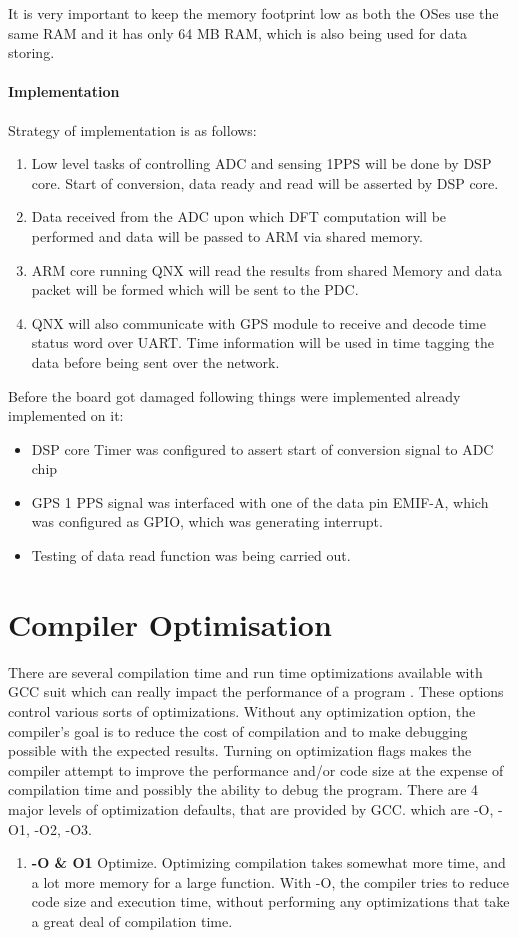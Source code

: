 \begin{appendix}
\begin{itemize}
\end{itemize}
It is very important to keep the memory footprint low as both the OSes use the same RAM and it has only 64 MB RAM, which is also being used for data storing.

\subsubsection{Implementation}
Strategy of implementation is as follows:
\begin{enumerate}
	\item Low level tasks of controlling ADC and sensing 1PPS will be done by DSP core.  Start of conversion, data ready and read will be asserted by DSP core. 
	\item Data received from the ADC upon which DFT computation will be performed and data will be passed to ARM via shared memory.
	\item ARM core running QNX will read the results from shared Memory and data packet will be formed which will be sent to the PDC.
	\item QNX will also communicate with GPS module to receive and decode time status word over UART. Time information will be used in time tagging the data before being sent over the network. 
\end{enumerate}
Before the board got damaged following things were implemented already implemented on it:
\begin{itemize}
	\item DSP core Timer was configured to assert start of conversion signal to ADC chip
	\item GPS 1 PPS signal was interfaced with one of the data pin EMIF-A, which was configured as GPIO, which was generating interrupt. 
	\item Testing of data read function was being carried out.
\end{itemize}

\chapter{Compiler Optimisation}

There are several compilation time and run time optimizations available with GCC suit which can really impact the performance of a program \cite{compilerOpti}. These options control various sorts of optimizations. Without any optimization option, the compiler's goal is to reduce the cost of compilation and to make debugging possible with the expected results. Turning on optimization flags makes the compiler attempt to improve the performance and/or code size at the expense of compilation time and possibly the ability to debug the program. There are 4 major levels of optimization defaults, that are provided by GCC. which are -O, -O1, -O2, -O3.
\begin{enumerate}
	\item \textbf{-O \& O1}
	Optimize. Optimizing compilation takes somewhat more time, and a lot more memory for a large function. With -O, the compiler tries to reduce code size and execution time, without performing any optimizations that take a great deal of compilation time.
	

\end{enumerate}
\end{appendix}
